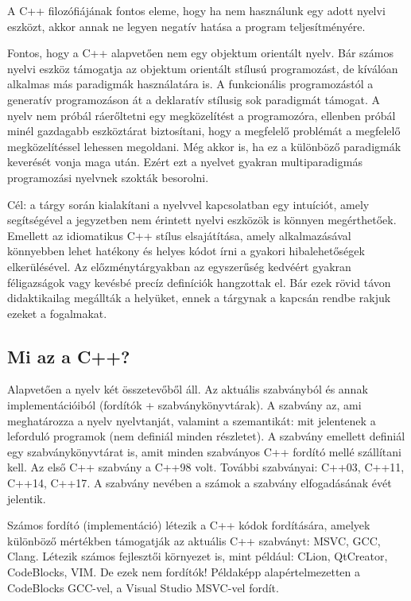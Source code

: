 \documentclass[a4paper,11.5pt,table]{article}
\begin{document}
	A C++ filozófiájának fontos eleme, hogy ha nem használunk egy adott nyelvi eszközt, akkor annak ne legyen negatív hatása a program teljesítményére.
	
	Fontos, hogy a C++ alapvetően nem egy objektum orientált nyelv. Bár számos nyelvi eszköz támogatja az objektum orientált stílusú programozást, de kíválóan alkalmas más paradigmák használatára is. A funkcionális programozástól a generatív programozáson át a deklaratív stílusig sok paradigmát támogat. A nyelv nem próbál ráerőltetni egy megközelítést a programozóra, ellenben próbál minél gazdagabb eszköztárat biztosítani, hogy a megfelelő problémát a megfelelő megközelítéssel lehessen megoldani. Még akkor is, ha ez a különböző paradigmák keverését vonja maga után. Ezért ezt a nyelvet gyakran multiparadigmás programozási nyelvnek szokták besorolni. 

	\medskip
	Cél: a tárgy során kialakítani a nyelvvel kapcsolatban egy intuíciót, amely segítségével a jegyzetben nem érintett nyelvi eszközök is könnyen megérthetőek. Emellett az idiomatikus C++ stílus elsajátítása, amely alkalmazásával könnyebben lehet hatékony és helyes kódot írni a gyakori hibalehetőségek elkerülésével. Az előzménytárgyakban az egyszerűség kedvéért gyakran féligazságok vagy kevésbé precíz definíciók hangzottak el. Bár ezek rövid távon didaktikailag megállták a helyüket, ennek a tárgynak a kapcsán rendbe rakjuk ezeket a fogalmakat.

	\subsection{Mi az a C++?}
	Alapvetően a nyelv két összetevőből áll. Az aktuális szabványból és annak implementációiból (fordítók + szabványkönyvtárak). A szabvány az, ami meghatározza a nyelv nyelvtanját, valamint a szemantikát: mit jelentenek a leforduló programok (nem definiál minden részletet). A szabvány emellett definiál egy szabványkönyvtárat is, amit minden szabványos C++ fordító mellé szállítani kell. Az első C++ szabvány a {C++98} volt. További szabványai: {C++03}, {C++11}, {C++14}, {C++17}. A szabvány nevében a számok a szabvány elfogadásának évét jelentik. 
	
	\medskip
	Számos fordító (implementáció) létezik a C++ kódok fordítására, amelyek különböző mértékben támogatják az aktuális C++ szabványt: MSVC, GCC, Clang.
	Létezik számos fejlesztői környezet is, mint például: CLion, QtCreator, CodeBlocks, VIM. De ezek nem fordítók! Példaképp alapértelmezetten a CodeBlocks GCC-vel, a Visual Studio MSVC-vel fordít.
\end{document}
